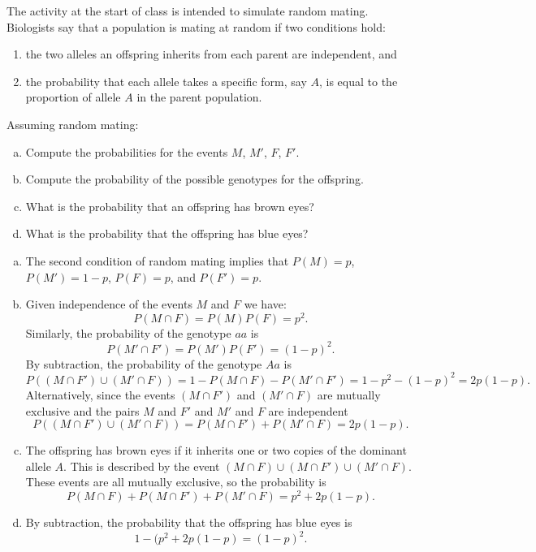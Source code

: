 \documentclass[addpoints,answers]{exam}
\begin{document}
\begin{questions}
    \question
   The activity at the start of class is intended to simulate random mating. Biologists say that a population is mating at random if two conditions hold:
  \begin{enumerate}
  \item the two alleles an offspring inherits from each parent are independent, and 
  \item the probability that each allele takes a specific form, say $A$, is equal to the proportion of allele $A$ in the parent population.
  \end{enumerate}

  \medskip

  Assuming random mating:
  \begin{enumerate}[a)]
  \item Compute the probabilities for the events $M$, $M'$, $F$, $F'$.  
  \item Compute the probability of the possible genotypes for the offspring. 
  \item What is the probability that an offspring has brown eyes? 
  \item What is the probability that the offspring has blue eyes?
  \end{enumerate}
  
  \begin{solution}
  \begin{enumerate}[a)]
  \item The second condition of random mating implies that $P(M)=p$, $P(M')=1-p$, $P(F)=p$, and $P(F')=p$. 
  
  \item Given independence of the events $M$ and $F$ we have:
      \[
        P(M \cap F)=P(M) P(F)=p^2. 
      \]
      Similarly, the probability of the genotype $aa$ is
      \[
        P(M' \cap F')=P(M') P(F')=(1-p)^2. 
      \]
      By subtraction, the probability of the genotype $Aa$ is
      \[
        P((M \cap F') \cup (M' \cap F))=1-P(M \cap F)-P(M' \cap F')=1-p^2-(1-p)^2=2p(1-p).
      \]
      Alternatively, since the events $(M \cap F')$ and $(M' \cap F)$ are mutually exclusive and the pairs $M$ and $F'$ and $M'$ and $F$ are independent
      \[
        P((M \cap F') \cup (M' \cap F))=P(M \cap F') + P(M' \cap F)=2p(1-p).
      \]
      
      \item The offspring has brown eyes if it inherits one or two copies of the dominant allele $A$. This is described by the event $(M \cap F) \cup (M \cap F') \cup (M' \cap F)$. These events are all mutually exclusive, so the probability is
      \[
         P(M \cap F) + P(M \cap F') + P(M' \cap F)=p^2 + 2p(1-p).
       \]
       \item By subtraction, the probability that the offspring has blue eyes is 
       \[
         1-(p^2 + 2p(1-p)=(1-p)^2.
       \]
       

\end{enumerate}
\end{solution}
\end{questions}
\end{document}
